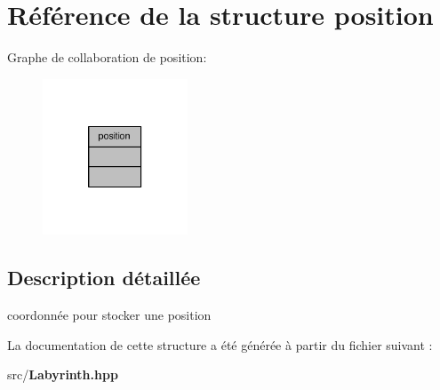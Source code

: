 \section{Référence de la structure position}
\label{structposition}


Graphe de collaboration de position\-:\nopagebreak
\begin{figure}[H]
\begin{center}
\leavevmode
\includegraphics[width=122pt]{structposition__coll__graph}
\end{center}
\end{figure}


\subsection{Description détaillée}
coordonnée pour stocker une position 

La documentation de cette structure a été générée à partir du fichier suivant \-:\begin{DoxyCompactItemize}
\item 
src/{\bf Labyrinth.\-hpp}\end{DoxyCompactItemize}
